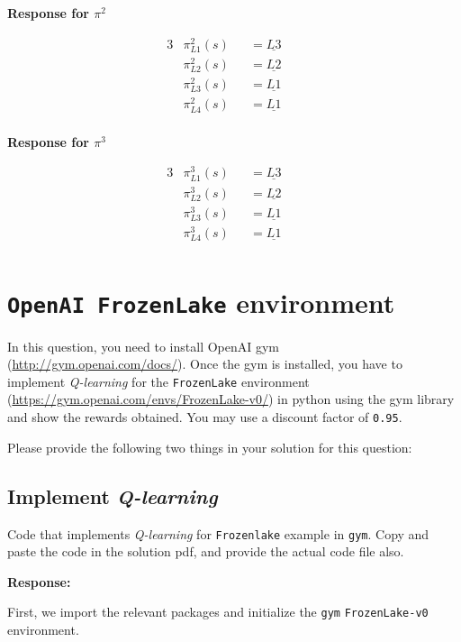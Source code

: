 \documentclass[12pt, letterpaper]{article}
\newcommand{\mybox}[1]{\par\noindent\colorbox{shadecolor}
{\parbox{\dimexpr\textwidth-2\fboxsep\relax}{#1}}}
\begin{document}
\textbf{Response for $\pi^2$}

\begin{alignat*}{3}
    &\pi^2_{L1}(s) &&= \underline{\textbf{$L3$}} && \\
    &\pi^2_{L2}(s) &&= \underline{\textbf{$L2$}} && \\
    &\pi^2_{L3}(s) &&= \underline{\textbf{$L1$}} && \\
    &\pi^2_{L4}(s) &&= \underline{\textbf{$L1$}} && \\
\end{alignat*}

\textbf{Response for $\pi^3$}

\begin{alignat*}{3}
    &\pi^3_{L1}(s) &&= \underline{\textbf{$L3$}} && \\
    &\pi^3_{L2}(s) &&= \underline{\textbf{$L2$}} && \\
    &\pi^3_{L3}(s) &&= \underline{\textbf{$L1$}} && \\
    &\pi^3_{L4}(s) &&= \underline{\textbf{$L1$}} && \\
\end{alignat*}

\section{\texttt{OpenAI FrozenLake} environment}

\mybox{In this question, you need to install OpenAI gym (\href{http://gym.openai.com/docs/}{http://gym.openai.com/docs/}). 
Once the gym is installed, you have to implement \textit{Q-learning} for the \texttt{FrozenLake} environment (\href{https://gym.openai.com/envs/FrozenLake-v0/}{https://gym.openai.com/envs/FrozenLake-v0/}) in python using the gym library and show the rewards obtained. 
You may use a discount factor of \texttt{0.95}.

Please provide the following two things in your solution for this question:}

\subsection{Implement \textit{Q-learning}}
\mybox{Code that implements \textit{Q-learning} for \texttt{Frozenlake} example in \texttt{gym}. 
Copy and paste the code in the solution pdf, and provide the actual code file also.}

\textbf{Response:}

First, we import the relevant packages and initialize the \texttt{gym} \texttt{FrozenLake-v0} environment.
\end{document}
